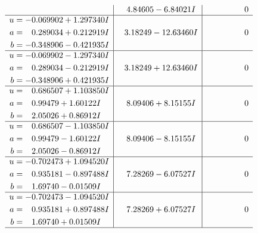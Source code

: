 \documentclass[1p]{elsarticle_modified}
\theoremstyle{definition}
\begin{document}
$$\begin{array}{c|c|c}
 & \phantom{-}4.84605 - 6.84021 I & \phantom{-0.000000 } 0 \\ \hline\begin{aligned}
u &= -0.069902 + 1.297340 I \\
a &= \phantom{-}0.289034 + 0.212919 I \\
b &= -0.348906 - 0.421935 I\end{aligned}
 & \phantom{-}3.18249 - 12.63460 I & \phantom{-0.000000 } 0 \\ \hline\begin{aligned}
u &= -0.069902 - 1.297340 I \\
a &= \phantom{-}0.289034 - 0.212919 I \\
b &= -0.348906 + 0.421935 I\end{aligned}
 & \phantom{-}3.18249 + 12.63460 I & \phantom{-0.000000 } 0 \\ \hline\begin{aligned}
u &= \phantom{-}0.686507 + 1.103850 I \\
a &= \phantom{-}0.99479 + 1.60122 I \\
b &= \phantom{-}2.05026 + 0.86912 I\end{aligned}
 & \phantom{-}8.09406 + 8.15155 I & \phantom{-0.000000 } 0 \\ \hline\begin{aligned}
u &= \phantom{-}0.686507 - 1.103850 I \\
a &= \phantom{-}0.99479 - 1.60122 I \\
b &= \phantom{-}2.05026 - 0.86912 I\end{aligned}
 & \phantom{-}8.09406 - 8.15155 I & \phantom{-0.000000 } 0 \\ \hline\begin{aligned}
u &= -0.702473 + 1.094520 I \\
a &= \phantom{-}0.935181 - 0.897488 I \\
b &= \phantom{-}1.69740 - 0.01509 I\end{aligned}
 & \phantom{-}7.28269 - 6.07527 I & \phantom{-0.000000 } 0 \\ \hline\begin{aligned}
u &= -0.702473 - 1.094520 I \\
a &= \phantom{-}0.935181 + 0.897488 I \\
b &= \phantom{-}1.69740 + 0.01509 I\end{aligned}
 & \phantom{-}7.28269 + 6.07527 I & \phantom{-0.000000 } 0\\
 \hline 
 \end{array}$$\newpage$$\begin{array}{c|c|c}  

\end{array}$$
\end{document}
